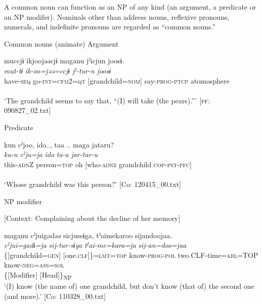 A common noun can function as an NP of any kind (an argument, a predicate or an NP modifer). Nominals other than address nouns, reflexive pronouns, numerals, and indefinite pronouns are regarded as “common nouns.”

\ea \label{ex:7:1}  Common nouns (animate)
\ea \label{ex:7:a}Argument

\gllll  muccjɨ  ikjoojəəcjɨ  maganu  jˀicjun   joosɨ.\\
\textit{mut-tɨ}  \textit{ik-oo=jəə=ccjɨ}  \textit{}  \textit{jˀ-tur-n}   \textit{joosɨ}\\
have-\textsc{seq}  go-\textsc{int}=\textsc{cfm}2=\textsc{qt}  [grandchild=\textsc{nom}]  say-\textsc{prog}-\textsc{ptcp} atomosphere\\
[Subject]  \\
\glt ‘The grandchild seems to say that, “(I) will take (the pears).”’ [\textsc{pf}: 090827\_02.txt]

\ex \label{ex:7:b}Predicate

\gllll  kun  cˀjoo,  ido..,  taa ..  maga   jataru?\\
\textit{ku-n}  \textit{cˀju=ja}  \textit{ido}  \textit{ta-a}  \textit{} \textit{jar-tar-u}\\
this-\textsc{adn}Z  person=\textsc{top}  oh  [who-\textsc{adnz}  grandchild \textsc{cop}-\textsc{pst}-\textsc{pfc}]\\
[Nominal predicate]\\
\glt ‘Whose grandchild was this person?’ [Co: 120415\_00.txt]

\ex \label{ex:7:c}NP modifier

    [Context: Complaining about the decline of her memory]

\gllll  maganu  cˀjuigadəə  sicjussɨga,                                tˀaimekaroo  sijandoojaa.\\
\textit{}  \textit{cˀjui=gadɨ=ja}  \textit{sij-tur-sɨga}         \textit{tˀai-me=kara=ja}  \textit{sij-an=doo=jaa}\\
\{[grandchild=\textsc{gen}]  [one.\textsc{clf}]\}=\textsc{lmt}=\textsc{top}  know-\textsc{prog}-\textsc{pol}                  two.CLF-time=\textsc{abl}=TOP  know-\textsc{neg}=\textsc{ass}=\textsc{sol}\\
\{[Modifier]  [Head]\}\textsubscript{NP}  \\
\glt ‘(I) know (the name of) one grandchild, but don’t know (that of) the second one (and more).’ [Co: 110328\_00.txt]
\z
\z


